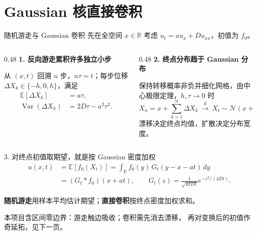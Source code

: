 \documentclass[UTF8,aspectratio=169,10pt]{ctexbeamer}
\begin{document}
\section{Gaussian 核直接卷积}
\begin{frame}{随机游走与 Gaussian 卷积}
\small
先在全空间 $x\in\mathbb R$ 考虑 $u_t=a u_x+D u_{xx}$，初值为 $f_0$。
\medskip
\begin{columns}[T,onlytextwidth]
\begin{column}{0.48\textwidth}
\textbf{1. 反向游走累积许多独立小步}

从 $(x,t)$ 回溯 $n$ 步，$n\tau=t$；每步位移 $\Delta X_k\in\{-h,0,h\}$，满足
\[
\begin{aligned}
\mathbb E[\Delta X_k]&=a\tau,\\
\operatorname{Var}(\Delta X_k)&=2D\tau-a^2\tau^2.
\end{aligned}
\]
\end{column}
\begin{column}{0.48\textwidth}
\textbf{2. 终点分布趋于 Gaussian 分布}

保持转移概率非负并细化网格，由中心极限定理，$h,\tau\to0$ 时
\[
X_n=x+\sum_{k=1}^{n}\Delta X_k
\ \xrightarrow{d}\ X_t\sim\mathcal N(x+at,\,2Dt).
\]
漂移决定终点均值，扩散决定分布宽度。
\end{column}
\end{columns}
\begin{block}{3. 对终点初值取期望，就是按 Gaussian 密度加权}
\[
\begin{aligned}
u(x,t)&=\mathbb E[f_0(X_t)]
=\int_{\mathbb R}f_0(y)\,G_t(y-x-at)\,dy\\
&=(G_t*f_0)(x+at),\qquad
G_t(z)=\frac{1}{\sqrt{4\pi Dt}}e^{-z^2/(4Dt)}.
\end{aligned}
\]
\end{block}
\textbf{随机游走}用样本平均估计期望；\textbf{直接卷积}按终点密度加权求和。
\smallskip\par
{\footnotesize 本项目含区间零边界：游走触边吸收；卷积需先消去漂移，
再对变换后的初值作奇延拓，见下一页。}
\end{frame}
\end{document}
